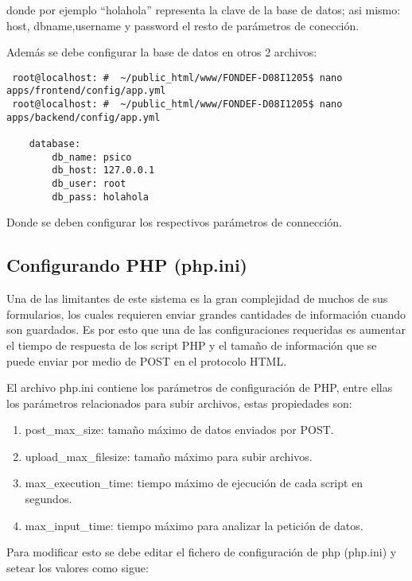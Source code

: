 donde por ejemplo  ``holahola'' representa la clave de la base de datos; asi mismo:  host, dbname,username y password el resto de par\'ametros de conecci\'on.\newline

Adem\'as se debe configurar la base de datos en otros 2 archivos:

\lstset{language=sh}
\begin{lstlisting}
 root@localhost: #  ~/public_html/www/FONDEF-D08I1205$ nano apps/frontend/config/app.yml
 root@localhost: #  ~/public_html/www/FONDEF-D08I1205$ nano apps/backend/config/app.yml

    database:
        db_name: psico
        db_host: 127.0.0.1
        db_user: root
        db_pass: holahola
\end{lstlisting}

Donde se deben configurar los respectivos par\'ametros de connecci\'on.



\subsection{Configurando PHP (php.ini)}

Una de las limitantes de este sistema es la gran complejidad de muchos de sus formularios, los cuales requieren enviar grandes cantidades de informaci\'on cuando son guardados. Es por esto que una de las configuraciones requeridas es aumentar el tiempo de respuesta de los script PHP y el tama\~no de informaci\'on que se puede enviar por medio de POST en el protocolo HTML.\newline

El archivo php.ini contiene los parámetros de configuración de PHP, entre ellas los parámetros relacionados para subir archivos, estas propiedades son:


\begin{enumerate}
 \item post\_max\_size: tamaño máximo de datos enviados por POST.
 \item upload\_max\_filesize: tamaño máximo para subir archivos.
 \item max\_execution\_time: tiempo máximo de ejecución de cada script en segundos.
 \item max\_input\_time: tiempo máximo para analizar la petición de datos.
\end{enumerate}

Para modificar esto se debe editar el fichero de configuraci\'on de php (php.ini) y setear los valores como sigue: \newline

